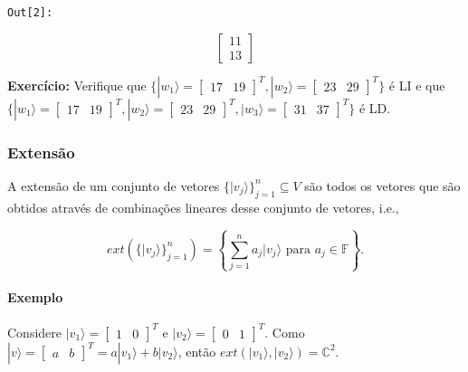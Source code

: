 \documentclass[11pt]{article}
\begin{document}
\texttt{\color{outcolor}Out[{\color{outcolor}2}]:}
    
    $$\left[\begin{matrix}11\\13\end{matrix}\right]$$

    

    \textbf{Exercício:} Verifique que
\(\{|w_{1}\rangle=\begin{bmatrix} 17 & 19 \end{bmatrix}^{T},|w_{2}\rangle=\begin{bmatrix} 23 & 29 \end{bmatrix}^{T}\}\)
é LI e que
\(\{|w_{1}\rangle=\begin{bmatrix} 17 & 19 \end{bmatrix}^{T},|w_{2}\rangle=\begin{bmatrix} 23 & 29 \end{bmatrix}^{T},|w_{3}\rangle=\begin{bmatrix} 31 & 37 \end{bmatrix}^{T}\}\)
é LD.

    \subsubsection{Extensão}\label{extensuxe3o}

A extensão de um conjunto de vetores
\(\{|v_{j}\rangle\}_{j=1}^{n}\subseteq V\) são todos os vetores que são
obtidos através de combinações lineares desse conjunto de vetores, i.e.,

\begin{equation}
ext(\{|v_{j}\rangle\}_{j=1}^{n}) = \left\{\sum_{j=1}^{n}a_{j}|v_{j}\rangle \text{ para } a_{j}\in\mathbb{F}\right\}.
\end{equation}

\paragraph{Exemplo}\label{exemplo}

Considere \(|v_{1}\rangle=\begin{bmatrix} 1 & 0 \end{bmatrix}^{T}\) e
\(|v_{2}\rangle=\begin{bmatrix} 0 & 1 \end{bmatrix}^{T}\). Como
\(|v\rangle=\begin{bmatrix} a & b \end{bmatrix}^{T}=a|v_{1}\rangle+b|v_{2}\rangle\),
então \(ext(|v_{1}\rangle,|v_{2}\rangle)=\mathbb{C}^{2}\).
\end{document}
